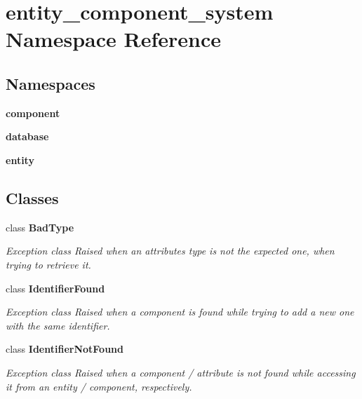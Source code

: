 \section{entity\+\_\+component\+\_\+system Namespace Reference}
\label{namespaceentity__component__system}
\subsection*{Namespaces}
\begin{DoxyCompactItemize}
\item 
 {\bf component}
\item 
 {\bf database}
\item 
 {\bf entity}
\end{DoxyCompactItemize}
\subsection*{Classes}
\begin{DoxyCompactItemize}
\item 
class {\bf Bad\+Type}
\begin{DoxyCompactList}\small\item\em Exception class Raised when an attribute\textquotesingle{}s type is not the expected one, when trying to retrieve it. \end{DoxyCompactList}\item 
class {\bf Identifier\+Found}
\begin{DoxyCompactList}\small\item\em Exception class Raised when a component is found while trying to add a new one with the same identifier. \end{DoxyCompactList}\item 
class {\bf Identifier\+Not\+Found}
\begin{DoxyCompactList}\small\item\em Exception class Raised when a component / attribute is not found while accessing it from an entity / component, respectively. \end{DoxyCompactList}\end{DoxyCompactItemize}
